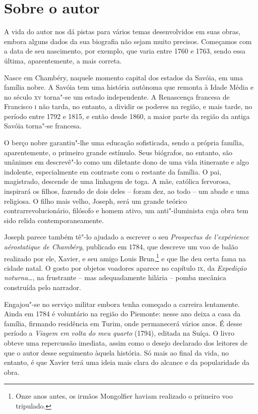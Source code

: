 
\section{Sobre o autor}

A vida do autor nos dá pistas para vários temas desenvolvidos em suas
obras, embora alguns dados da sua biografia não sejam muito precisos.
Começamos com a data de seu nascimento, por exemplo, que varia entre
1760 e 1763, sendo essa última, aparentemente, a mais correta. 

Nasce em Chambéry, naquele momento capital dos estados da Savóia, em uma
família nobre. A Savóia tem uma história autônoma que remonta à Idade
Média e no século \textsc{xv} torna"-se um estado independente. A Renascença
francesa de Francisco \textsc{i} não tarda, no entanto, a dividir os poderes na
região, e mais tarde, no período entre 1792 e 1815, e então desde 1860,
a maior parte da região da antiga Savóia torna"-se francesa. 

O berço nobre garantiu"-lhe uma educação sofisticada, sendo a própria
família, aparentemente, o primeiro grande estímulo. Seus biógrafos, no
entanto, são unânimes em descrevê"-lo como um diletante dono de uma
vida itinerante e algo indolente, especialmente em contraste com o
restante da família. O pai, magistrado, descende de uma linhagem de
toga. A mãe, católica fervorosa, inspirará os filhos, fazendo de dois
deles -- foram dez, ao todo -- um abade e uma religiosa. O filho mais
velho, Joseph, será um grande teórico contrarrevolucionário, filósofo e
homem ativo,  um anti"-iluminista cuja obra tem sido relida
contemporaneamente. 

 Joseph parece também tê"-lo ajudado a escrever o seu \textit{Prospectus
de l’expérience aérostatique de Chambéry}, publicado em 1784, que
descreve um voo de balão realizado por ele, Xavier, e seu amigo Louis
Brun,\footnote{ Onze anos antes, os irmãos Mongolfier haviam realizado o
primeiro voo tripulado.} e que lhe deu certa fama na cidade natal. O
gosto por objetos voadores aparece no capítulo \textsc{ix}, da \textit{Expedição
noturna\ldots}, na frustrante -- mas adequadamente hilária -- pomba mecânica
construída pelo narrador. 

Engajou"-se no serviço militar embora tenha começado a carreira
lentamente. Ainda em 1784 é voluntário na região do Piemonte: nesse ano
deixa a casa da família, firmando residência em Turim, onde permanecerá
vários anos. É desse período a \textit{Viagem em volta do meu quarto}
(1794), editada na Suíça. O livro obteve uma repercussão imediata,
assim como o desejo declarado dos leitores de que o autor desse
seguimento àquela história. Só mais ao final da vida, no entanto, é que
Xavier terá uma ideia mais clara do alcance e da popularidade da obra. 

